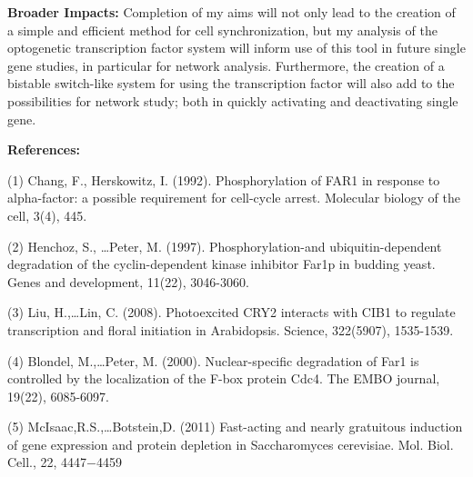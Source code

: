 \documentclass[12pt]{article}
\begin{document}
\textbf{Broader Impacts:}
Completion of my aims will not only lead to the creation of a simple and efficient method for cell synchronization, but my analysis of the optogenetic transcription factor system will inform use of this tool in future single gene studies, in particular for network analysis. Furthermore, the creation of a bistable switch-like system for using the transcription factor will also add to the possibilities for network study; both in quickly activating and deactivating single gene.

\small
\textbf{References:}

(1) Chang, F., Herskowitz, I. (1992). Phosphorylation of FAR1 in response to alpha-factor: a possible requirement for cell-cycle arrest. Molecular biology of the cell, 3(4), 445.

(2) Henchoz, S., \ldots Peter, M. (1997). Phosphorylation-and ubiquitin-dependent degradation of the cyclin-dependent kinase inhibitor Far1p in budding yeast. Genes and development, 11(22), 3046-3060. %

(3) Liu, H.,\ldots Lin, C. (2008). Photoexcited CRY2 interacts with CIB1 to regulate transcription and floral initiation in Arabidopsis. Science, 322(5907), 1535-1539. %

(4) Blondel, M.,\ldots Peter, M. (2000). Nuclear-specific degradation of Far1 is controlled by the localization of the F-box protein Cdc4. The EMBO journal, 19(22), 6085-6097. %

(5) McIsaac,R.S.,\ldots Botstein,D. (2011) Fast-acting and nearly gratuitous induction of gene expression and protein depletion in Saccharomyces cerevisiae. Mol. Biol.  Cell., 22, 4447$-$4459 %
\end{document}
